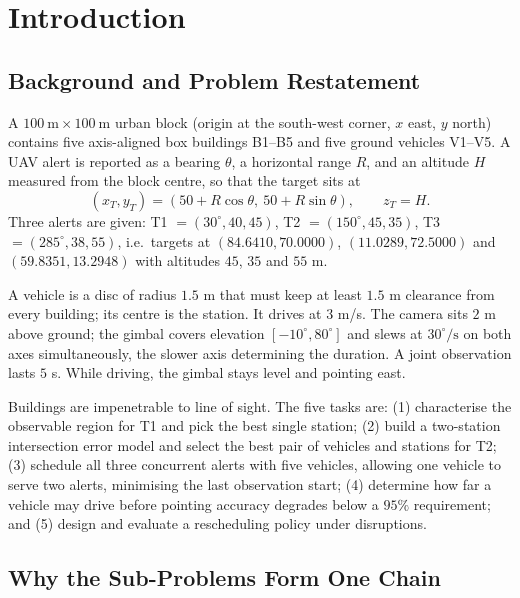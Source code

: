 \documentclass[12pt]{article}
\begin{document}
\newpage
\setcounter{page}{2}

\section{Introduction}

\subsection{Background and Problem Restatement}

A $100\ \mathrm{m}\times100\ \mathrm{m}$ urban block (origin at the south-west corner, $x$ east, $y$ north) contains five axis-aligned box buildings B1--B5 and five ground vehicles V1--V5. A UAV alert is reported as a bearing $\theta$, a horizontal range $R$, and an altitude $H$ measured from the block centre, so that the target sits at
\begin{equation}
\label{eq:target}
(x_T,y_T)=(50+R\cos\theta,\ 50+R\sin\theta),\qquad z_T=H .
\end{equation}
Three alerts are given: T1 $=(30^\circ,40,45)$, T2 $=(150^\circ,45,35)$, T3 $=(285^\circ,38,55)$, i.e.\ targets at $(84.6410,70.0000)$, $(11.0289,72.5000)$ and $(59.8351,13.2948)$ with altitudes $45$, $35$ and $55$ m.

A vehicle is a disc of radius $1.5$ m that must keep at least $1.5$ m clearance from every building; its centre is the station. It drives at $3$ m/s. The camera sits $2$ m above ground; the gimbal covers elevation $[-10^\circ,80^\circ]$ and slews at $30^\circ/\mathrm{s}$ on both axes simultaneously, the slower axis determining the duration. A joint observation lasts $5$ s. While driving, the gimbal stays level and pointing east.

Buildings are impenetrable to line of sight. The five tasks are: (1) characterise the observable region for T1 and pick the best single station; (2) build a two-station intersection error model and select the best pair of vehicles and stations for T2; (3) schedule all three concurrent alerts with five vehicles, allowing one vehicle to serve two alerts, minimising the last observation start; (4) determine how far a vehicle may drive before pointing accuracy degrades below a $95\%$ requirement; and (5) design and evaluate a rescheduling policy under disruptions.

\subsection{Why the Sub-Problems Form One Chain}
\end{document}
